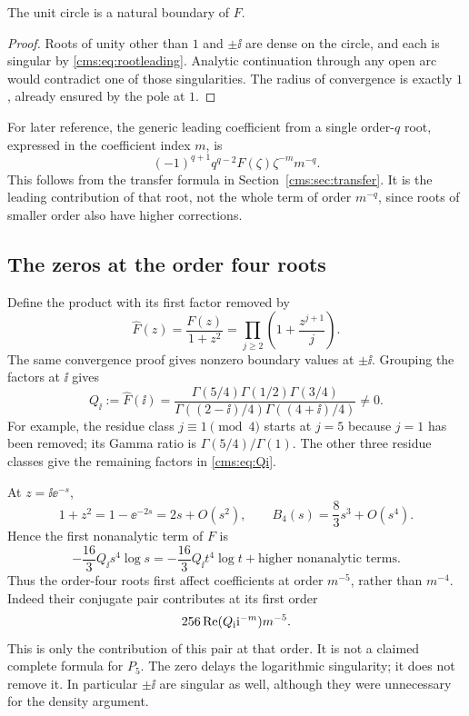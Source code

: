 \begin{corollary}\label{cms:cor:natural}
The unit circle is a natural boundary of $F$.
\end{corollary}
\begin{proof}
Roots of unity other than $1$ and $\pm\ii$ are dense on the circle, and each is singular by \eqref{cms:eq:rootleading}. Analytic continuation through any open arc would contradict one of those singularities. The radius of convergence is exactly $1$, already ensured by the pole at $1$.
\end{proof}

For later reference, the generic leading coefficient from a single order-$q$ root, expressed in the coefficient index $m$, is
\begin{equation}\label{cms:eq:genericcoefficient}
(-1)^{q+1}q^{q-2}F(\zeta)\zeta^{-m}m^{-q}.
\end{equation}
This follows from the transfer formula in Section~\ref{cms:sec:transfer}. It is the leading contribution of that root, not the whole term of order $m^{-q}$, since roots of smaller order also have higher corrections.

\subsection{The zeros at the order four roots}
Define the product with its first factor removed by
\[
\widehat F(z)=\frac{F(z)}{1+z^2}
 =\prod_{j\geq2}\left(1+\frac{z^{j+1}}j\right).
\]
The same convergence proof gives nonzero boundary values at $\pm\ii$. Grouping the factors at $\ii$ gives
\begin{equation}\label{cms:eq:Qi}
Q_{\ii}:=\widehat F(\ii)
=\frac{\Gamma(5/4)\Gamma(1/2)\Gamma(3/4)}
 {\Gamma((2-\ii)/4)\Gamma((4+\ii)/4)}\ne0.
\end{equation}
For example, the residue class $j\equiv1\pmod4$ starts at $j=5$ because $j=1$ has been removed; its Gamma ratio is $\Gamma(5/4)/\Gamma(1)$. The other three residue classes give the remaining factors in \eqref{cms:eq:Qi}.

At $z=\ii\ee^{-s}$,
\[
1+z^2=1-\ee^{-2s}=2s+O(s^2),\qquad
B_4(s)=\frac83s^3+O(s^4).
\]
Hence the first nonanalytic term of $F$ is
\begin{equation}\label{cms:eq:izero}
-\frac{16}{3}Q_{\ii}s^4\log s
=-\frac{16}{3}Q_{\ii}t^4\log t+\text{higher nonanalytic terms}.
\end{equation}
Thus the order-four roots first affect coefficients at order $m^{-5}$, rather than $m^{-4}$. Indeed their conjugate pair contributes at its first order
\begin{equation}\label{cms:eq:ipair}
256\operatorname{Re}(Q_{\mathrm i}\mathrm i^{-m})m^{-5}.
\end{equation}
This is only the contribution of this pair at that order. It is not a claimed complete formula for $P_5$. The zero delays the logarithmic singularity; it does not remove it. In particular $\pm\ii$ are singular as well, although they were unnecessary for the density argument.
